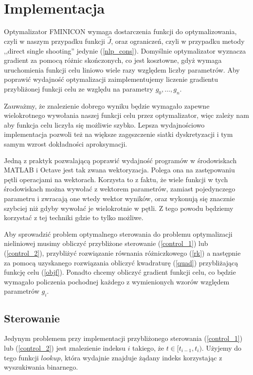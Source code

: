 \documentclass[licencjacka]{pracamgr}
\begin{document}
\chapter{Implementacja}
Optymalizator FMINICON wymaga dostarczenia funkcji do optymalizowania, czyli w naszym przypadku funkcji $\hat{J}$, oraz ograniczeń, czyli w przypadku metody ,,direct single shooting'' jedynie (\ref{nlp_cons}). Domyślnie optymalizator wyznacza gradient za pomocą różnic skończonych, co jest kosztowne, gdyż wymaga uruchomienia funkcji celu liniowo wiele razy względem liczby parametrów. Aby poprawić wydajność optymalizacji zaimplementujemy liczenie gradientu przybliżonej funkcji celu ze względu na parametry $g_0,\ldots, g_n$.

Zauważmy, że znalezienie dobrego wyniku będzie wymagało zapewne wielokrotnego wywołania naszej funkcji celu przez optymalizator, więc zależy nam aby funkcja celu liczyła się możliwie szybko. Lepsza wydajnościowo implementacja pozwoli też na większe zagęszczenie siatki dyskretyzacji i tym samym wzrost dokładności aproksymacji.

Jedną z praktyk pozwalającą poprawić wydajność programów w środowiskach MATLAB i Octave jest tak zwana wektoryzacja. Polega ona na zastępowaniu pętli operacjami na wektorach. Korzysta to z faktu, że wiele funkcji w tych środowiskach można wywołać z wektorem parametrów, zamiast pojedynczego parametru i zwracają one wtedy wektor wyników, oraz wykonują się znacznie szybciej niż gdyby wywołać je wielokrotnie w pętli. Z tego powodu będziemy korzystać z tej techniki gdzie to tylko możliwe.

Aby sprowadzić problem optymalnego sterowania do problemu optymalizacji nieliniowej musimy obliczyć przybliżone sterowanie (\ref{control_1}) lub (\ref{control_2}), przybliżyć rozwiązanie równania różniczkowego (\ref{rk}) a następnie za pomocą uzyskanego rozwiązania obliczyć kwadraturę (\ref{quad}) przybliżającą funkcję celu (\ref{objf}). Ponadto chcemy obliczyć gradient funkcji celu, co będzie wymagało policzenia pochodnej każdego z wymienionych wzorów względem parametrów $g_i$.

\section{Sterowanie}\label{subsec_sterowanie}
Jedynym problemem przy implementacji przybliżonego sterowania (\ref{control_1}) lub (\ref{control_2}) jest znalezienie indeksu $i$ takiego, że $t \in [t_{i-1}, t_i)$. Użyjemy do tego funkcji $lookup$, która wydajnie znajduje żądany indeks korzystając z wyszukiwania binarnego.
\end{document}
